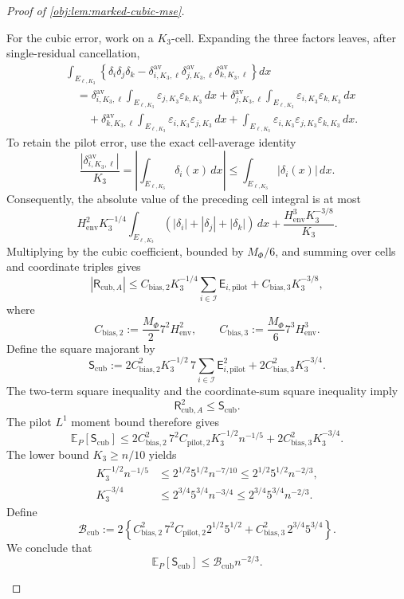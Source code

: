 \begin{proof}[Proof of \cref{obj:lem:marked-cubic-mse}]
\begin{enumerate}
For the cubic error, work on a \(K_3\)-cell. Expanding the three factors leaves, after single-residual cancellation,
\[
\begin{aligned}
&\int_{E_{\ell,K_3}}
\left\{
\delta_i\delta_j\delta_k
-\delta^{\mathrm{av}}_{i,K_3,\ell}
 \delta^{\mathrm{av}}_{j,K_3,\ell}
 \delta^{\mathrm{av}}_{k,K_3,\ell}
\right\}dx\\
&\quad=
\delta^{\mathrm{av}}_{i,K_3,\ell}
\int_{E_{\ell,K_3}}\varepsilon_{j,K_3}\varepsilon_{k,K_3}\,dx
+\delta^{\mathrm{av}}_{j,K_3,\ell}
\int_{E_{\ell,K_3}}\varepsilon_{i,K_3}\varepsilon_{k,K_3}\,dx\\
&\qquad+
\delta^{\mathrm{av}}_{k,K_3,\ell}
\int_{E_{\ell,K_3}}\varepsilon_{i,K_3}\varepsilon_{j,K_3}\,dx
+\int_{E_{\ell,K_3}}
\varepsilon_{i,K_3}\varepsilon_{j,K_3}\varepsilon_{k,K_3}\,dx.
\end{aligned}
\]
To retain the pilot error, use the exact cell-average identity
\[
\frac{|\delta^{\mathrm{av}}_{i,K_3,\ell}|}{K_3}
=
\left|\int_{E_{\ell,K_3}}\delta_i(x)\,dx\right|
\le\int_{E_{\ell,K_3}}|\delta_i(x)|\,dx.
\]
Consequently, the absolute value of the preceding cell integral is at most
\[
H_{\mathrm{env}}^2K_3^{-1/4}
\int_{E_{\ell,K_3}}(|\delta_i|+|\delta_j|+|\delta_k|)\,dx
+\frac{H_{\mathrm{env}}^3K_3^{-3/8}}{K_3}.
\]
Multiplying by the cubic coefficient, bounded by \(M_\Phi/6\), and summing over cells and coordinate triples gives
\[
|\mathsf R_{\mathrm{cub},A}|
\le
C_{\mathrm{bias},2}K_3^{-1/4}
\sum_{i\in\mathcal I}\mathsf E_{i,\mathrm{pilot}}
+C_{\mathrm{bias},3}K_3^{-3/8},
\]
where
\[
C_{\mathrm{bias},2}
:=\frac{M_\Phi}{2}7^2H_{\mathrm{env}}^2,
\qquad
C_{\mathrm{bias},3}
:=\frac{M_\Phi}{6}7^3H_{\mathrm{env}}^3.
\]
Define the square majorant by
\[
\mathsf S_{\mathrm{cub}}
:=
2C_{\mathrm{bias},2}^2K_3^{-1/2}
\,7\sum_{i\in\mathcal I}\mathsf E_{i,\mathrm{pilot}}^2
+2C_{\mathrm{bias},3}^2K_3^{-3/4}.
\]
The two-term square inequality and the coordinate-sum square inequality imply
\[
\mathsf R_{\mathrm{cub},A}^2\le\mathsf S_{\mathrm{cub}}.
\]
The pilot \(L^1\) moment bound therefore gives
\[
\mathbb E_P[\mathsf S_{\mathrm{cub}}]
\le
2C_{\mathrm{bias},2}^2\,7^2C_{\mathrm{pilot},2}
K_3^{-1/2}n^{-1/5}
+2C_{\mathrm{bias},3}^2K_3^{-3/4}.
\]
The lower bound \(K_3\ge n/10\) yields
\[
\begin{aligned}
K_3^{-1/2}n^{-1/5}
&\le2^{1/2}5^{1/2}n^{-7/10}
\le2^{1/2}5^{1/2}n^{-2/3},\\
K_3^{-3/4}
&\le2^{3/4}5^{3/4}n^{-3/4}
\le2^{3/4}5^{3/4}n^{-2/3}.
\end{aligned}
\]
Define
\[
\mathcal B_{\mathrm{cub}}
:=
2\left\{
C_{\mathrm{bias},2}^2\,7^2C_{\mathrm{pilot},2}
2^{1/2}5^{1/2}
+C_{\mathrm{bias},3}^2\,2^{3/4}5^{3/4}
\right\}.
\]
We conclude that
\[
\mathbb E_P[\mathsf S_{\mathrm{cub}}]
\le\mathcal B_{\mathrm{cub}}n^{-2/3}.
\]


\end{enumerate}
\end{proof}
